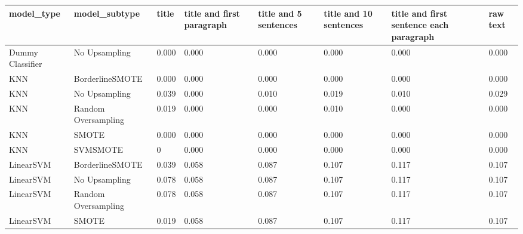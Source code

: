 \begin{tabular}{llllllll}
\toprule
                  model\_type &       model\_subtype & title & title and first paragraph & title and 5 sentences & title and 10 sentences & title and first sentence each paragraph & raw text \\
\midrule
            Dummy Classifier &       No Upsampling & 0.000 &                     0.000 &                 0.000 &                  0.000 &                                   0.000 &    0.000 \\
                         KNN &     BorderlineSMOTE & 0.000 &                     0.000 &                 0.000 &                  0.000 &                                   0.000 &    0.000 \\
                         KNN &       No Upsampling & 0.039 &                     0.000 &                 0.010 &                  0.019 &                                   0.010 &    0.029 \\
                         KNN & Random Oversampling & 0.019 &                     0.000 &                 0.000 &                  0.010 &                                   0.000 &    0.000 \\
                         KNN &               SMOTE & 0.000 &                     0.000 &                 0.000 &                  0.000 &                                   0.000 &    0.000 \\
                         KNN &            SVMSMOTE &     0 &                     0.000 &                 0.000 &                  0.000 &                                   0.000 &    0.000 \\
                   LinearSVM &     BorderlineSMOTE & 0.039 &                     0.058 &                 0.087 &                  0.107 &                                   0.117 &    0.107 \\
                   LinearSVM &       No Upsampling & 0.078 &                     0.058 &                 0.087 &                  0.107 &                                   0.117 &    0.107 \\
                   LinearSVM & Random Oversampling & 0.078 &                     0.058 &                 0.087 &                  0.107 &                                   0.117 &    0.107 \\
                   LinearSVM &               SMOTE & 0.019 &                     0.058 &                 0.087 &                  0.107 &                                   0.117 &    0.107 \\

\end{tabular}
